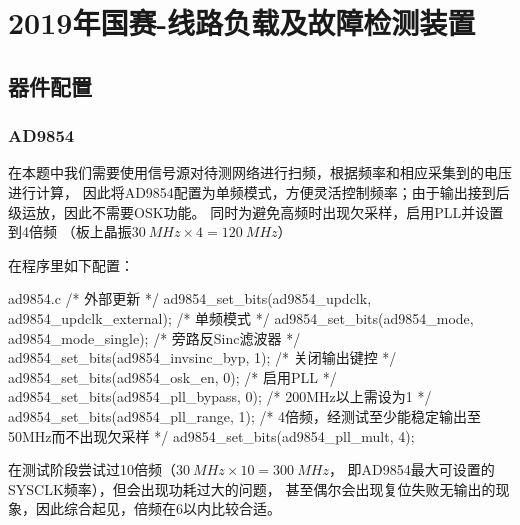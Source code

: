 \section{2019年国赛-线路负载及故障检测装置}
\subsection{器件配置}
\subsubsection{AD9854}
在本题中我们需要使用信号源对待测网络进行扫频，根据频率和相应采集到的电压进行计算，
因此将AD9854配置为单频模式，方便灵活控制频率；由于输出接到后级运放，因此不需要OSK功能。
同时为避免高频时出现欠采样，启用PLL并设置到4倍频
（板上晶振$\SI{30}{MHz}\times 4 = \SI{120}{MHz}$）

在程序里如下配置：

\begin{cbox}{ad9854.c}
  /* 外部更新 */
  ad9854_set_bits(ad9854_updclk, ad9854_updclk_external);
  /* 单频模式 */
  ad9854_set_bits(ad9854_mode, ad9854_mode_single);
  /* 旁路反Sinc滤波器 */
  ad9854_set_bits(ad9854_invsinc_byp, 1);
  /* 关闭输出键控 */
  ad9854_set_bits(ad9854_osk_en, 0);
  /* 启用PLL */
  ad9854_set_bits(ad9854_pll_bypass, 0);
  /* 200MHz以上需设为1 */
  ad9854_set_bits(ad9854_pll_range, 1);
  /* 4倍频，经测试至少能稳定输出至50MHz而不出现欠采样 */
  ad9854_set_bits(ad9854_pll_mult, 4);
\end{cbox}

在测试阶段尝试过10倍频（$\SI{30}{MHz}\times 10 = \SI{300}{MHz}$，
即AD9854最大可设置的SYSCLK频率），但会出现功耗过大的问题，
甚至偶尔会出现复位失败无输出的现象，因此综合起见，倍频在6以内比较合适。